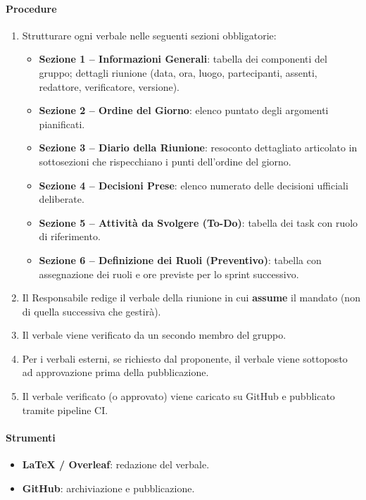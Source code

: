 \documentclass[a4paper, 11pt, oneside]{scrartcl}
\begin{document}
\paragraph{Procedure}
\begin{enumerate}
    \item Strutturare ogni verbale nelle seguenti sezioni obbligatorie:
          \begin{itemize}
              \item \textbf{Sezione 1 – Informazioni Generali}: tabella dei componenti del gruppo; dettagli riunione (data, ora, luogo, partecipanti, assenti, redattore, verificatore, versione).
              \item \textbf{Sezione 2 – Ordine del Giorno}: elenco puntato degli argomenti pianificati.
              \item \textbf{Sezione 3 – Diario della Riunione}: resoconto dettagliato articolato in sottosezioni che rispecchiano i punti dell'ordine del giorno.
              \item \textbf{Sezione 4 – Decisioni Prese}: elenco numerato delle decisioni ufficiali deliberate.
              \item \textbf{Sezione 5 – Attività da Svolgere (To-Do)}: tabella dei task con ruolo di riferimento.
              \item \textbf{Sezione 6 – Definizione dei Ruoli (Preventivo)}: tabella con assegnazione dei ruoli e ore previste per lo sprint successivo.
          \end{itemize}
    \item Il Responsabile redige il verbale della riunione in cui \textbf{assume} il mandato (non di quella successiva che gestirà).
    \item Il verbale viene verificato da un secondo membro del gruppo.
    \item Per i verbali esterni, se richiesto dal proponente, il verbale viene sottoposto ad approvazione prima della pubblicazione.
    \item Il verbale verificato (o approvato) viene caricato su GitHub e pubblicato tramite pipeline CI.
\end{enumerate}

\paragraph{Strumenti}
\begin{itemize}
    \item \textbf{\LaTeX{} / Overleaf}: redazione del verbale.
    \item \textbf{GitHub}: archiviazione e pubblicazione.
\end{itemize}
\end{document}
